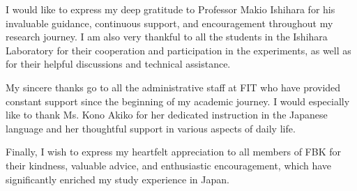 \documentclass[uplatex,
12pt, %
a4paper,
english, %
oneside,
titlepage,
singlespacing, %
liststotoc, %
headsepline,
]{MastersDoctoralThesis} %
\begin{document}
\begin{acknowledgements}
\addchaptertocentry{\acknowledgementname} %
%
I would like to express my deep gratitude to Professor Makio Ishihara for his invaluable guidance, continuous support, and encouragement throughout my research journey. I am also very thankful to all the students in the Ishihara Laboratory for their cooperation and participation in the experiments, as well as for their helpful discussions and technical assistance.

\vspace{+0.5cm}
My sincere thanks go to all the administrative staff at FIT who have provided constant support since the beginning of my academic journey. I would especially like to thank Ms. Kono Akiko for her dedicated instruction in the Japanese language and her thoughtful support in various aspects of daily life.

\vspace{+0.5cm}
Finally, I wish to express my heartfelt appreciation to all members of FBK for their kindness, valuable advice, and enthusiastic encouragement, which have significantly enriched my study experience in Japan.

\end{acknowledgements}







%
%
%
\end{document}
